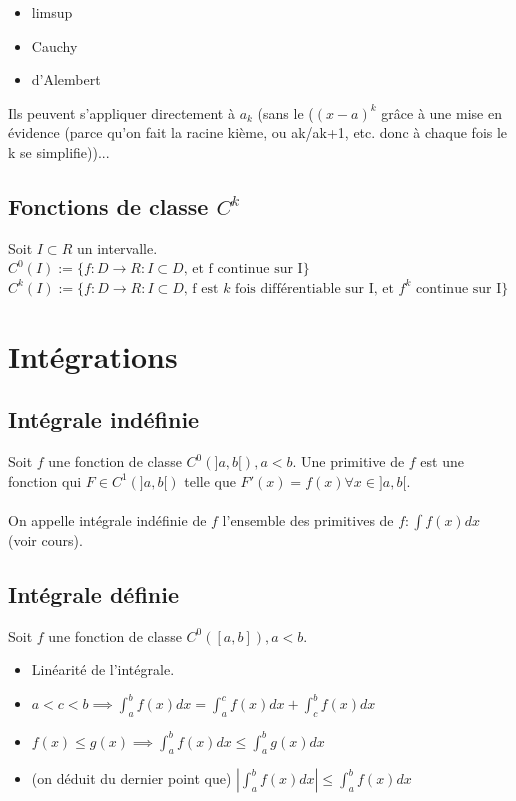 \documentclass{article}
\begin{document}
\begin{itemize}
    \item limsup
    \item Cauchy
    \item d'Alembert
\end{itemize}
Ils peuvent s'appliquer directement à $ a_k $ (sans le ($(x-a)^k$ grâce à une mise en évidence (parce qu'on fait la racine kième, ou ak/ak+1, etc. donc à chaque fois le k se simplifie))...

\subsection{Fonctions de classe $C^k$}

Soit $ I \subset R $ un intervalle.\\
$C^0(I) := \{ f : D \to R : I \subset D \text{, et f continue sur I} \}$\\
$C^k(I) := \{ f : D \to R : I \subset D \text{, f est $k$ fois différentiable sur I, et $f^k$ continue sur I} \}$

\section{Intégrations}

\subsection{Intégrale indéfinie}

Soit $ f $ une fonction de classe $ C^0(]a, b[), a < b $. Une primitive de $ f  $ est une fonction qui $ F \in C^1(]a, b[) $ telle que $ F'(x) = f(x) \forall x \in ]a, b[ $. \\\\
On appelle intégrale indéfinie de $ f $ l'ensemble des primitives de $ f : \int f(x)dx $ (voir cours).

\subsection{Intégrale définie}

Soit $ f $ une fonction de classe $ C^0([a, b]), a < b $.

\begin{itemize}
    \item Linéarité de l'intégrale.
    \item $ a < c < b \implies \int_{a}^bf(x)dx = \int_{a}^c f(x)dx + \int_{c}^b f(x)dx$
    \item $ f(x) \leq g(x) \implies \int_{a}^b f(x)dx \leq \int_{a}^b g(x)dx $
    \item (on déduit du dernier point que) $ |\int_{a}^bf(x)dx| \leq \int_{a}^bf(x)dx $ 
\end{itemize}
\end{document}

